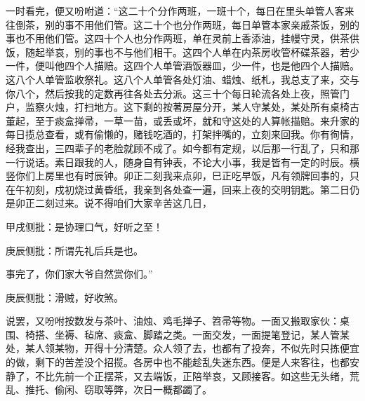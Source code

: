 \begin{parag}


    一时看完，便又吩咐道：“这二十个分作两班，一班十个，每日在里头单管人客来往倒茶，别的事不用他们管。这二十个也分作两班，每日单管本家亲戚茶饭，别的事也不用他们管。这四十个人也分作两班，单在灵前上香添油，挂幔守灵，供茶供饭，随起举哀，别的事也不与他们相干。这四个人单在内茶房收管杯碟茶器，若少一件，便叫他四个人描赔。这四个人单管酒饭器皿，少一件，也是他四个人描赔。这八个人单管监收祭礼。这八个人单管各处灯油、蜡烛、纸札，我总支了来，交与你八个，然后按我的定数再往各处去分派。这三十个每日轮流各处上夜，照管门户，监察火烛，打扫地方。这下剩的按著房屋分开，某人守某处，某处所有桌椅古董起，至于痰盒掸帚，一草一苗，或丢或坏，就和守这处的人算帐描赔。来升家的每日揽总查看，或有偷懒的，赌钱吃酒的，打架拌嘴的，立刻来回我。你有徇情，经我查出，三四辈子的老脸就顾不成了。如今都有定规，以后那一行乱了，只和那一行说话。素日跟我的人，随身自有钟表，不论大小事，我是皆有一定的时辰。横竖你们上房里也有时辰钟。卯正二刻我来点卯，巳正吃早饭，凡有领牌回事的，只在午初刻，戍初烧过黄昏纸，我亲到各处查一遍，回来上夜的交明钥匙。第二日仍是卯正二刻过来。说不得咱们大家辛苦这几日，\begin{note}甲戌侧批：是协理口气，好听之至！\end{note}\begin{note}庚辰侧批：所谓先礼后兵是也。\end{note}事完了，你们家大爷自然赏你们。”\begin{note}庚辰侧批：滑贼，好收煞。\end{note}
\end{parag}


\begin{parag}


    说罢，又吩咐按数发与茶叶、油烛、鸡毛掸子、笤帚等物。一面又搬取家伙：桌围、椅搭、坐褥、毡席、痰盒、脚踏之类。一面交发，一面提笔登记，某人管某处，某人领某物，开得十分清楚。众人领了去，也都有了投奔，不似先时只拣便宜的做，剩下的苦差没个招揽。各房中也不能趁乱失迷东西。便是人来客往，也都安静了，不比先前一个正摆茶，又去端饭，正陪举哀，又顾接客。如这些无头绪，荒乱、推托、偷闲、窃取等弊，次日一概都蠲了。
\end{parag}


